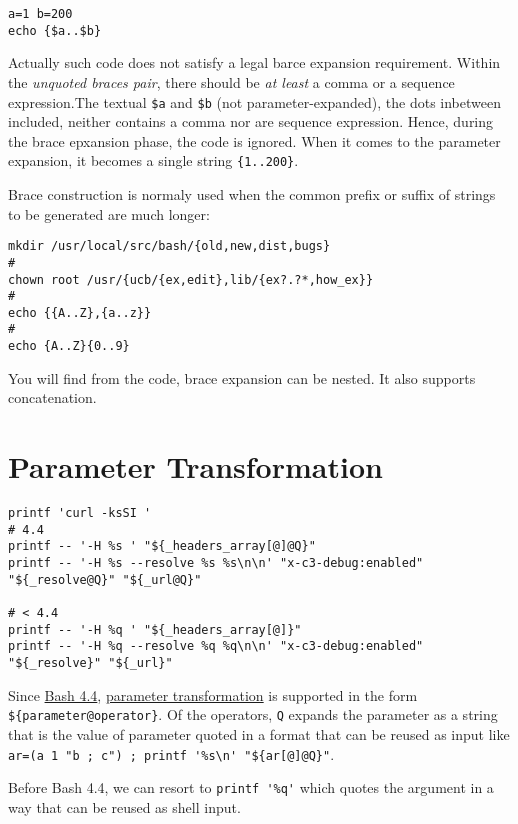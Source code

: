 \begin{lstlisting}
a=1 b=200
echo {$a..$b}
\end{lstlisting}

Actually such code does not satisfy a legal barce expansion
requirement. Within the \textit{unquoted braces pair}, there
should be \textit{at least} a comma or a sequence expression.The
textual \verb|$a| and \verb|$b| (not parameter-expanded), the dots
inbetween included, neither contains a comma nor are sequence
expression. Hence, during the brace epxansion phase, the code is
ignored. When it comes to the parameter expansion, it becomes a
single string \lstinline|{1..200}|.

Brace construction is normaly used when the common prefix or
suffix of strings to be generated are much longer:

\begin{lstlisting}
mkdir /usr/local/src/bash/{old,new,dist,bugs}
#
chown root /usr/{ucb/{ex,edit},lib/{ex?.?*,how_ex}}
#
echo {{A..Z},{a..z}}
#
echo {A..Z}{0..9}
\end{lstlisting}

You will find from the code, brace expansion can be nested. It
also supports concatenation.

\section{Parameter Transformation}
\label{sec:bash-param-transf}

\begin{lstlisting}
printf 'curl -ksSI '
# 4.4
printf -- '-H %s ' "${_headers_array[@]@Q}"
printf -- '-H %s --resolve %s %s\n\n' "x-c3-debug:enabled" "${_resolve@Q}" "${_url@Q}"

# < 4.4
printf -- '-H %q ' "${_headers_array[@]}"
printf -- '-H %q --resolve %q %q\n\n' "x-c3-debug:enabled" "${_resolve}" "${_url}"
\end{lstlisting}

Since \href{http://mywiki.wooledge.org/BashFAQ/061}{Bash 4.4},
\uline{parameter transformation} is supported in the form
\lstinline|${parameter@operator}|. Of the operators, \verb|Q|
expands the parameter as a string that is the value of parameter
quoted in a format that can be reused as input like
\lstinline|ar=(a 1 "b ; c") ; printf '%s\n' "${ar[@]@Q}"|.

Before Bash 4.4, we can resort to \lstinline|printf '%q'| which
quotes the argument in a way that can be reused as shell input.


